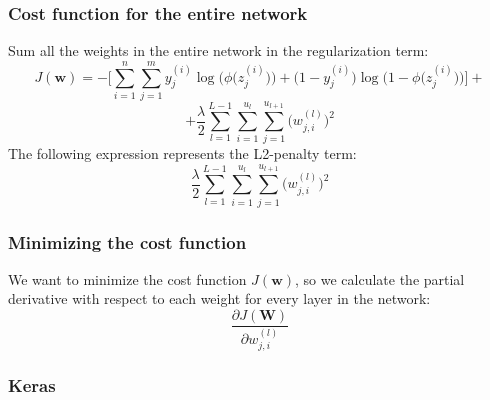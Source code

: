\documentclass{beamer}
\begin{document}
\begin{frame}
  \frametitle{Cost function for the entire network}
  Sum all the weights in the entire network in the regularization term:
  \[
  J(\mathbf{w}) = - \Bigg[ \sum_{i=1}^{n} \sum_{j=1}^{m} y_{j}^{(i)}  \log \bigg( \phi \Big( z_{j}^{(i)} \Big) \bigg) + \Big(1 - y_{j}^{(i)} \Big) \log  \bigg(1 - \phi \Big( z_{j}^{(i)} \Big)  \bigg) \Bigg] +
  \]
  \[
  + \frac{\lambda}{2} \sum_{l=1}^{L-1} \sum_{i=1}^{u_l} \sum_{j=1}^{u_{l+1}} \Big(w_{j, i}^{(l)}\Big)^2
  \]
  The following expression represents the L2-penalty term:
  \[
  \frac{\lambda}{2} \sum_{l=1}^{L-1} \sum_{i=1}^{u_l} \sum_{j=1}^{u_{l+1}} \Big(w_{j, i}^{(l)}\Big)^2
  \]
\end{frame}

\begin{frame}
  \frametitle{Minimizing the cost function}
  We want to minimize the cost function $J(\mathbf{w})$, so we calculate the partial derivative with respect to each weight for every layer in the network:
  \[
  \frac{\partial J(\mathbf{W})}{\partial w_{j, i}^{(l)}}
  \]
\end{frame}

\begin{frame}
  \frametitle{Keras}
  \href{https://github.com/fchollet/deep-learning-with-python-notebooks}{} \\
  \href{https://nbviewer.jupyter.org/github/fchollet/deep-learning-with-python-notebooks/blob/master/3.5-classifying-movie-reviews.ipynb}{}

\end{frame}
\end{document}
